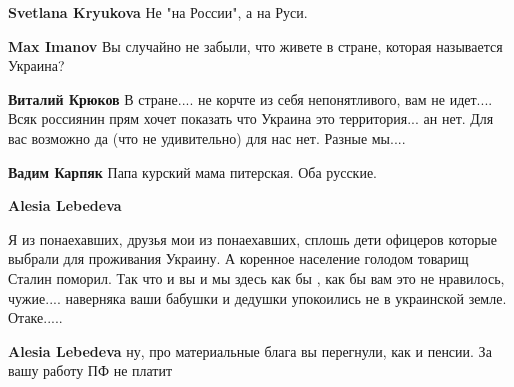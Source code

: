 \begin{itemize}
\begin{itemize}
\textbf{Svetlana Kryukova} Не "на России", а на Руси.

 
\textbf{Max Imanov} Вы случайно не забыли, что живете в стране, которая называется Украина?

 
\textbf{Виталий Крюков} В стране.... не корчте из себя непонятливого, вам не идет.... Всяк россиянин прям хочет показать что Украина это территория... ан нет. Для вас возможно да (что не удивительно) для нас нет. Разные мы....

 
\textbf{Вадим Карпяк} Папа курский мама питерская. Оба русские.

 
\textbf{Alesia Lebedeva} 

Я из понаехавших, друзья мои из понаехавших, сплошь дети офицеров которые
выбрали для проживания Украину. А коренное население голодом товарищ Сталин
поморил. Так что и вы и мы здесь как бы , как бы вам это не нравилось,
чужие.... наверняка ваши бабушки и дедушки упокоились не в украинской земле.
Отаке.....


 
\textbf{Alesia Lebedeva} ну, про материальные блага вы перегнули, как и пенсии. За вашу работу ПФ не платит

 

\end{itemize}
\end{itemize}
